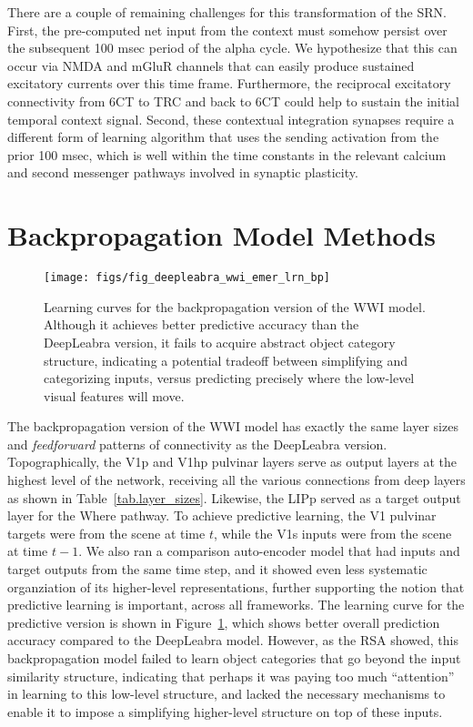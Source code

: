 \documentclass[12pt,twoside]{article}
\newif\myifpdf
\begin{document}
There are a couple of remaining challenges for this transformation of the SRN.  First, the pre-computed net input from the context must somehow persist over the subsequent 100 msec period of the alpha cycle.  We hypothesize that this can occur via NMDA and mGluR channels that can easily produce sustained excitatory currents over this time frame.  Furthermore, the reciprocal excitatory connectivity from 6CT to TRC and back to 6CT could help to sustain the initial temporal context signal.  Second, these contextual integration synapses require a different form of learning algorithm that uses the sending activation from the prior 100 msec, which is well within the time constants in the relevant calcium and second messenger pathways involved in synaptic plasticity.


\section{Backpropagation Model Methods}

\begin{figure}
  \centering\texttt{[image: figs/fig\_deepleabra\_wwi\_emer\_lrn\_bp]}
  \caption{Learning curves for the backpropagation version of the WWI model.  Although it achieves better predictive accuracy than the DeepLeabra version, it fails to acquire abstract object category structure, indicating a potential tradeoff between simplifying and categorizing inputs, versus predicting precisely where the low-level visual features will move.}
  \label{fig.bp_lrn}
\end{figure}

The backpropagation version of the WWI model has exactly the same layer sizes and {\em feedforward} patterns of connectivity as the DeepLeabra version.  Topographically, the V1p and V1hp pulvinar layers serve as output layers at the highest level of the network, receiving all the various connections from deep layers as shown in Table~\ref{tab.layer_sizes}.  Likewise, the LIPp served as a target output layer for the Where pathway.  To achieve predictive learning, the V1 pulvinar targets were from the scene at time $t$, while the V1s inputs were from the scene at time $t-1$.  We also ran a comparison auto-encoder model that had inputs and target outputs from the same time step, and it showed even less systematic organziation of its higher-level representations, further supporting the notion that predictive learning is important, across all frameworks.  The learning curve for the predictive version is shown in Figure~\ref{fig.bp_lrn}, which shows better overall prediction accuracy compared to the DeepLeabra model.  However, as the RSA showed, this backpropagation model failed to learn object categories that go beyond the input similarity structure, indicating that perhaps it was paying too much ``attention'' in learning to this low-level structure, and lacked the necessary mechanisms to enable it to impose a simplifying higher-level structure on top of these inputs.
\end{document}
